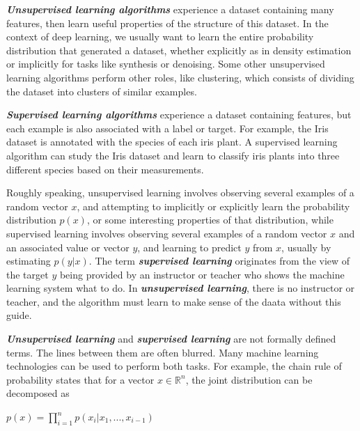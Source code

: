 \documentclass{report}
\begin{document}
\noindent \textbf{\textit{Unsupervised learning algorithms}} experience a dataset containing many features, then learn useful properties of the structure of this dataset. In the context of deep learning, we usually want to learn the entire probability distribution that generated a dataset, whether explicitly as in density estimation or implicitly for tasks like synthesis or denoising. Some other unsupervised learning algorithms perform other roles, like clustering, which consists of dividing the dataset into clusters of similar examples.\newline

\noindent \textbf{\textit{Supervised learning algorithms}} experience a dataset containing features, but each example is also associated with a label or target. For example, the Iris dataset is annotated with the species of each iris plant. A supervised learning algorithm can study the Iris dataset and learn to classify iris plants into three different species based on their measurements.\newline

\noindent Roughly speaking, unsupervised learning involves observing several examples of a random vector $x$, and attempting to implicitly or explicitly learn the probability distribution $p(x)$, or some interesting properties of that distribution, while supervised learning involves observing several examples of a random vector $x$ and an associated value or vector $y$, and learning to predict $y$ from $x$, usually by estimating $p(y|x)$. The term \textbf{\textit{supervised learning}} originates from the view of the target $y$ being provided by an instructor or teacher who shows the machine learning system what to do. In \textbf{\textit{unsupervised learning}}, there is no instructor or teacher, and the algorithm must learn to make sense of the daata without this guide.\newline

\textbf{\textit{Unsupervised learning}} and \textbf{\textit{supervised learning}} are not formally defined terms. The lines between them are often blurred. Many machine learning technologies can be used to perform both tasks. For example, the chain rule of probability states that for a vector $x \in \mathbb{R}^n$, the joint distribution can be decomposed as\newline\newline
\centerline{$p(x) = \prod_{i=1}^{n} p(x_i | x_1, ..., x_{i-1})$}\newline\newline
\end{document}
